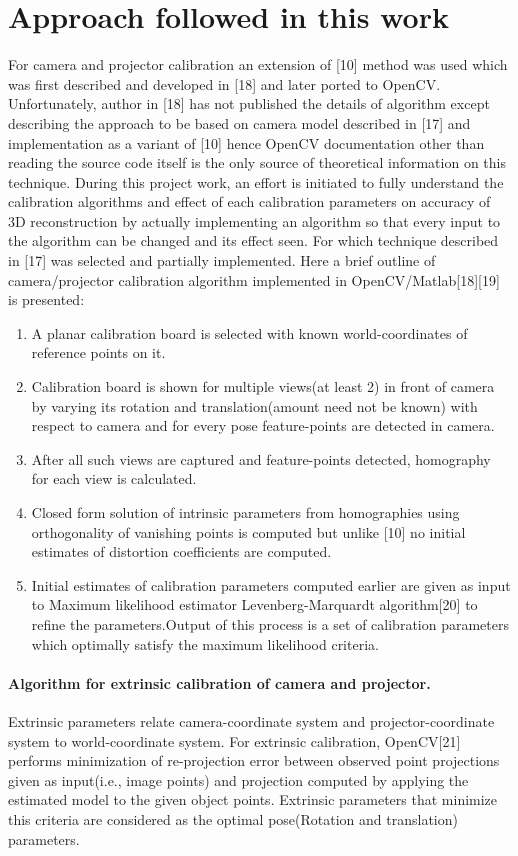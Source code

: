  
  
\section{Approach followed in this work}  
For camera and projector calibration an extension of [10] method was used which was first described and developed in [18] and later ported to OpenCV. Unfortunately, author in [18] has not published the details of algorithm except describing the approach to be based on camera model described in [17] and implementation as a variant of [10] hence  
OpenCV documentation other than reading the source code itself is the only source of  
theoretical information on this technique. During this project work, an effort is initiated  
to fully understand the calibration algorithms and effect of each calibration  
parameters on accuracy of 3D reconstruction by actually implementing an algorithm  
so that every input to the algorithm can be changed and its effect seen. For which technique described in [17] was selected and partially implemented. Here a brief outline of camera/projector calibration algorithm implemented in OpenCV/Matlab[18][19] is presented:  
\begin{enumerate}
\item A planar calibration board is selected with known world-coordinates of reference points on it.  
\item Calibration board is shown for multiple views(at least 2) in front of camera by varying its rotation and translation(amount need not be known) with respect to camera and for every pose feature-points are  
detected in camera.  
\item After all such views are captured and feature-points detected, homography for each view is calculated.  
\item Closed form solution of intrinsic parameters from homographies using orthogonality of vanishing points is computed but unlike [10] no initial estimates of distortion coefficients are computed.  
\item Initial estimates of calibration parameters computed earlier are given as input to Maximum likelihood estimator Levenberg-Marquardt algorithm[20] to refine the parameters.Output of this process is a set of calibration parameters which optimally satisfy the maximum likelihood criteria.  
\end{enumerate}

 
\paragraph{Algorithm for extrinsic calibration of camera and projector.}  
Extrinsic parameters relate camera-coordinate system and projector-coordinate system to world-coordinate system. For  
extrinsic calibration, OpenCV[21] performs minimization of re-projection error between  
observed point projections given as input(i.e., image points) and projection computed  
by applying the estimated model to the given object points. Extrinsic parameters that  
minimize this criteria are considered as the optimal pose(Rotation and translation)  
parameters.  
  
